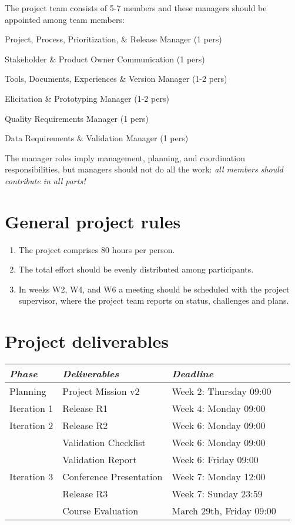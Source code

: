 \noindent The project team consists of 5-7 members and these managers should be appointed among team members:

\begin{description}[noitemsep]
\item[P3RM] Project, Process, Prioritization, \& Release Manager (1 pers)
\item[SPOC] Stakeholder \& Product Owner Communication (1 pers)
\item[TDEVM] Tools, Documents, Experiences \& Version Manager (1-2 pers)
\item[EPM] Elicitation \& Prototyping Manager (1-2 pers)
\item[QRM] Quality Requirements Manager (1 pers)
\item[DRVM] Data Requirements \& Validation Manager (1 pers)
\end{description}

\noindent The manager roles imply management, planning, and coordination responsibilities, but managers should not do all the work: {\it all members should contribute in all parts!}
\fi 

\section{General project rules}
\begin{enumerate}[noitemsep]
\item The project comprises 80 hours per person.
\item The total effort should be evenly distributed among participants.
\item In weeks W2, W4, and W6 a meeting should be scheduled with the project supervisor, where the project team reports on status, challenges and plans.
\end{enumerate}

\section{Project deliverables}
\begin{tabular}{l |l p{5cm}  l}
{\it Phase} & {\it Deliverables} & {\it Deadline} \\
\hline
Planning & Project Mission v2& Week 2: Thursday 09:00\\
Iteration 1 & Release R1 & Week 4: Monday 09:00 \\
Iteration 2 & Release R2  & Week 6: Monday 09:00\\
   & Validation Checklist & Week 6: Monday 09:00\\
   & Validation Report & Week 6: Friday 09:00\\
Iteration 3 & Conference Presentation & Week 7: Monday 12:00\\
   & Release R3 & Week 7: Sunday 23:59\\
   & Course Evaluation & March 29th, Friday 09:00  \\

\end{tabular}
\vskip3mm

